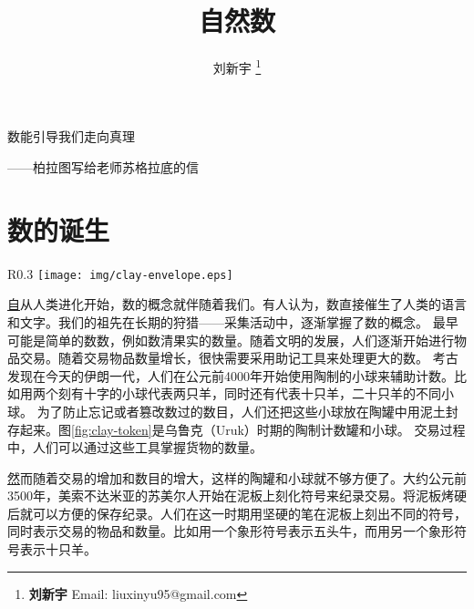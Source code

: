 \documentclass[UTF8]{article}
\begin{document}

\title{自然数}

\author{刘新宇
\thanks{{\bfseries 刘新宇} \newline
  Email: liuxinyu95@gmail.com \newline}
  }

\maketitle
\fi


\epigraph{数能引导我们走向真理}{——柏拉图写给老师苏格拉底的信}

\section{数的诞生}

\begin{wrapfigure}{R}{0.3\textwidth}
 \centering
 \texttt{[image: img/clay-envelope.eps]}
 \caption{卢浮宫陈列的乌鲁尔时期的计数陶罐和一组计数陶球。}
 \label{fig:clay-token}
\end{wrapfigure}

\underline{自}从人类进化开始，数的概念就伴随着我们。有人认为，数直接催生了人类的语言和文字。我们的祖先在长期的狩猎——采集活动中，逐渐掌握了数的概念。
最早可能是简单的数数，例如数清果实的数量。随着文明的发展，人们逐渐开始进行物品交易。随着交易物品数量增长，很快需要采用助记工具来处理更大的数。
考古发现在今天的伊朗一代，人们在公元前4000年开始使用陶制的小球来辅助计数。比如用两个刻有十字的小球代表两只羊，同时还有代表十只羊，二十只羊的不同小球。
为了防止忘记或者篡改数过的数目，人们还把这些小球放在陶罐中用泥土封存起来。图\ref{fig:clay-token}是乌鲁克（Uruk）时期的陶制计数罐和小球\cite{wiki-number}。
交易过程中，人们可以通过这些工具掌握货物的数量\cite{trip-to-number-kindom}。

\underline{然}而随着交易的增加和数目的增大，这样的陶罐和小球就不够方便了。大约公元前3500年，美索不达米亚的苏美尔人开始在泥板上刻化符号来纪录交易。将泥板烤硬后就可以方便的保存纪录。人们在这一时期用坚硬的笔在泥板上刻出不同的符号，同时表示交易的物品和数量。比如用一个象形符号表示五头牛，而用另一个象形符号表示十只羊。
\end{document}
